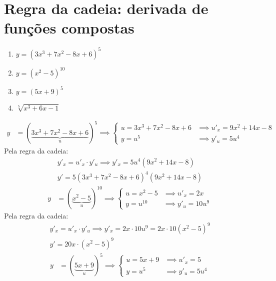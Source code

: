 \documentclass{jhwhw}
\begin{document}
\chapter{Regra da cadeia: derivada de funções compostas}
\begin{enumerate}
    \item $y = (3x^3 + 7x^2 - 8x + 6)^5$
    \item $y = (x^2 -5)^{10}$
    \item $y = (5x+9)^5$
    \item $\sqrt[5]{x^3 + 6x - 1}$
\end{enumerate}
\begin{align*}
    y & = (\underbrace{3x^3 + 7x^2 - 8x + 6}_{u})^5 \implies
    \begin{cases}
        u = 3x^3 + 7x^2 - 8x + 6 & \implies u'^{}_x = 9x^2 + 14x - 8 \\
        y = u^5                  & \implies y'^{}_u = 5u^4
    \end{cases}
\end{align*}
Pela regra da cadeia:
\begin{multline*}
    y'^{}_x = u'^{}_x \cdot y'^{}_u \implies y'^{}_x = 5u^4(9x^2 + 14x - 8) \\ \boxed{y' = 5(3x^3 + 7x^2 - 8x + 6)^4(9x^2 + 14x - 8)}
\end{multline*}
\begin{align*}
    y & = (\underbrace{x^2 -5}_{u})^{10} \implies
    \begin{cases}
        u = x^2 -5 & \implies u'^{}_x = 2x    \\
        y = u^{10} & \implies y'^{}_u = 10u^9
    \end{cases}
\end{align*}
Pela regra da cadeia:
\begin{multline*}
    y'^{}_x = u'^{}_x \cdot y'^{}_u \implies y'^{}_x = 2x \cdot 10u^9 = 2x \cdot 10(x^2-5)^9 \\ \boxed{y' = 20x\cdot(x^2-5)^9}
\end{multline*}
\begin{align*}
    y & = (\underbrace{5x+9}_{u})^{5} \implies
    \begin{cases}
        u = 5x+9  & \implies u'^{}_x = 5    \\
        y = u^{5} & \implies y'^{}_u = 5u^4
    \end{cases}
\end{align*}
\end{document}
